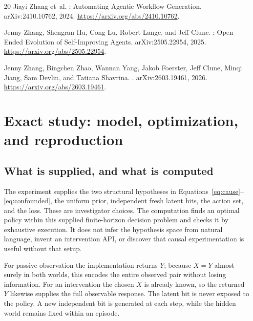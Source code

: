 \documentclass[11pt,letterpaper]{article}
\theoremstyle{remark}\newtheorem{remark}{Remark}[section]
\begin{document}
\begin{thebibliography}{20}
Jiayi Zhang et~al.
: Automating Agentic Workflow Generation.
\newblock arXiv:2410.10762, 2024.
\newblock \url{https://arxiv.org/abs/2410.10762}.

Jenny Zhang, Shengran Hu, Cong Lu, Robert Lange, and Jeff Clune.
: Open-Ended Evolution of Self-Improving Agents.
\newblock arXiv:2505.22954, 2025.
\newblock \url{https://arxiv.org/abs/2505.22954}.

Jenny Zhang, Bingchen Zhao, Wannan Yang, Jakob Foerster, Jeff Clune, Minqi Jiang, Sam Devlin, and Tatiana Shavrina.
.
\newblock arXiv:2603.19461, 2026.
\newblock \url{https://arxiv.org/abs/2603.19461}.

\end{thebibliography}
\endgroup

\clearpage
\appendix
\section{Exact study: model, optimization, and reproduction}
\label{app:study}
\subsection{What is supplied, and what is computed}
The experiment supplies the two structural hypotheses in Equations~\eqref{eq:cause}--\eqref{eq:confounded}, the uniform prior, independent fresh latent bits, the action set, and the loss. These are investigator choices. The computation finds an optimal policy within this supplied finite-horizon decision problem and checks it by exhaustive execution. It does not infer the hypothesis space from natural language, invent an intervention API, or discover that causal experimentation is useful without that setup.

For passive observation the implementation returns $Y$; because $X=Y$ almost surely in both worlds, this encodes the entire observed pair without losing information. For an intervention the chosen $X$ is already known, so the returned $Y$ likewise supplies the full observable response. The latent bit is never exposed to the policy. A new independent bit is generated at each step, while the hidden world remains fixed within an episode.
\end{document}
